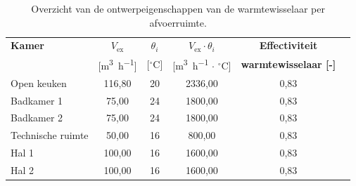 \documentclass[a4paper,12pt]{article}
\begin{document}
\begin{table}[H]
    \centering
    \caption{Overzicht van de ontwerpeigenschappen van de warmtewisselaar per afvoerruimte.}
    \label{tab:warmtewisselaar_extractie}
    \begin{tabularx}{\textwidth}{l c c c c c}
        \toprule
        \rowcolor{gray!20}
        \textbf{Kamer} & \textbf{$V_{\text{ex}}$} & \textbf{$\theta_i$} & \textbf{$V_{\text{ex}} \cdot \theta_i$} & \textbf{Effectiviteit}\\
        \rowcolor{gray!20}
        ~ & [\unit{\cubic\meter\per\hour}] & [$^\circ$C] & [\unit{\cubic\meter\per\hour} $\cdot$ $^\circ$C] & \textbf{warmtewisselaar [-]}  \\
        \midrule
        Open keuken       & 116,80 & 20 & 2336,00 & 0,83 \\
        Badkamer 1        & 75,00  & 24 & 1800,00 & 0,83 \\
        Badkamer 2        & 75,00  & 24 & 1800,00 & 0,83 \\
        Technische ruimte & 50,00  & 16 & 800,00  & 0,83 \\
        Hal 1             & 100,00 & 16 & 1600,00 & 0,83 \\
        Hal 2             & 100,00 & 16 & 1600,00 & 0,83  \\
        \bottomrule
    \end{tabularx}
\end{table}
\end{document}
